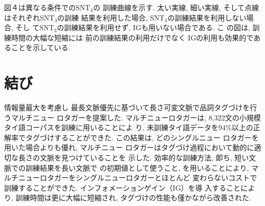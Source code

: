 図４は異なる条件でのSNT$_{4}$の
訓練曲線を示す. 太い実線, 細い実線, そして点線はそれぞれSNT$_{3}$の訓練
結果を利用した場合, SNT$_{3}$の訓練結果を利用しない場合, そし
てSNT$_{3}$の訓練結果を利用せず, IGも用いない場合である. こ
の図は, 訓練時間の大幅な短縮には
前の訓練結果の利用だけでなく
IGの利用も効果的であることを示している.

\vspace*{-3.5mm}
\section{結び}
\vspace*{-2.5mm}

情報量最大を考慮し
最長文脈優先に基づいて長さ可変文脈で品詞タグづけを行うマルチニュー
ロタガーを提案した.
マルチニューロタガーは, 8,322文の小規模タイ語コーパスを訓練に用いることによ
り, 未訓練タイ語データを94\%以上の正解率でタグづけすることができた. 
この結果は, どのシングルニュー
ロタガーを用いた場合よりも優れ, マルチニュー
ロタガーはタグづけ過程において動的に適切な長さの文脈を見つけていることを
示した. 効率的な訓練方法, 即ち, 短い文脈での訓練結果を長い文脈で
の初期値として使うこと, を用いることにより, 
マルチニューロタガーをシングルニューロタガーとほとんど
変わらないコストで訓練することができた. インフォメーションゲイン（IG）を導
入することにより, 訓練時間は更に大幅に短縮され, 
タグづけの性能も僅かながら改善された.

